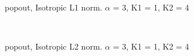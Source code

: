 \begin{figure}
  \centering
     \\
  \caption{popout, Isotropic L1 norm. $\alpha$ = 3, K1 = 1, K2 = 4}
  \label{fig:popout_L1_a3_k11_k24}
\end{figure}

\begin{figure}
  \centering
     \\
  \caption{popout, Isotropic L2 norm. $\alpha$ = 3, K1 = 1, K2 = 4}
  \label{fig:popout_L2_a3_k11_k24}
\end{figure}


